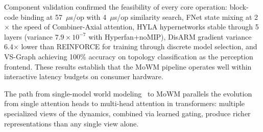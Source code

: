\documentclass[journal]{IEEEtai}
\begin{document}
Component validation confirmed the feasibility of every core operation: block-code binding at 57~$\mu$s/op with 4~$\mu$s/op similarity search, FNet state mixing at 2$\times$ the speed of Combiner-Axial attention, HYLA hypernetworks stable through 5 layers (variance $7.9 \times 10^{-7}$ with Hyperfan+noMIP), DisARM gradient variance 6.4$\times$ lower than REINFORCE for training through discrete model selection, and VS-Graph achieving 100\% accuracy on topology classification as the perception frontend. These results establish that the MoWM pipeline operates well within interactive latency budgets on consumer hardware.

The path from single-model world modeling~\cite{chung2025geometric} to MoWM parallels the evolution from single attention heads to multi-head attention in transformers: multiple specialized views of the dynamics, combined via learned gating, produce richer representations than any single view alone.
\end{document}
